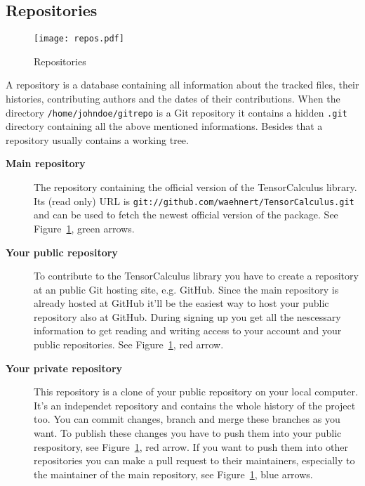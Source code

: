 \documentclass[a4paper,10pt]{scrartcl}
\begin{document}
\subsection*{Repositories}
\begin{figure}[b]
\centering
\texttt{[image: repos.pdf]}
\caption{Repositories}
\label{fig:repos}
\end{figure}
A repository is a database containing all information about the tracked files, their histories, contributing authors and the dates of their contributions. When the directory \texttt{/home/johndoe/gitrepo} is a Git repository it contains a hidden \texttt{.git} directory containing all the above mentioned informations. Besides that a repository usually contains a working tree.
\begin{description} 
 \item[\textbf{Main repository}] The repository containing the official version of the TensorCalculus library. Its (read only) URL is \texttt{git://github.com/waehnert/TensorCalculus.git} and can be used to fetch the newest official version of the package. See Figure~\ref{fig:repos}, green arrows.
  \item[\textbf{Your public repository}] To contribute to the TensorCalculus library you have to create a repository at an public Git hosting site, e.g. GitHub. Since the main repository is already hosted at GitHub it'll be the easiest way to host your public repository also at GitHub. During signing up you get all the nescessary information to get reading and writing access to your account and your public repositories. See Figure~\ref{fig:repos}, red arrow.
%
  \item[\textbf{Your private repository}] This repository is a clone of your public repository on your local computer. It's an independet repository and contains the whole history of the project too. You can commit changes, branch and merge these branches as you want. To publish these changes you have to push them into your public respository, see Figure~\ref{fig:repos}, red arrow. If you want to push them into other repositories you can make a pull request to their maintainers, especially to the maintainer of the main repository, see Figure~\ref{fig:repos}, blue arrows.
\end{description}
\end{document}
